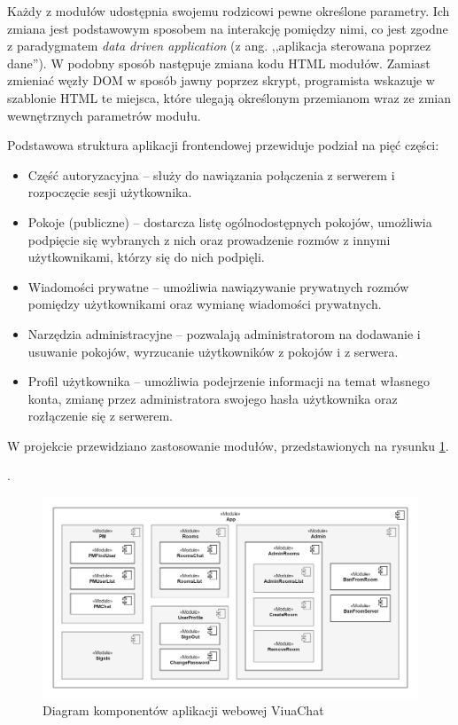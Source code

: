 Każdy z modułów udostępnia swojemu rodzicowi pewne określone parametry. Ich zmiana
jest podstawowym sposobem na interakcję pomiędzy nimi, co jest zgodne z
paradygmatem \textit{data driven application} (z ang. ,,aplikacja sterowana
poprzez dane''). W podobny sposób następuje zmiana kodu HTML modułów. Zamiast
zmieniać węzły DOM w sposób jawny poprzez skrypt, programista wskazuje w
szablonie HTML te miejsca, które ulegają określonym przemianom wraz ze
zmian wewnętrznych parametrów modułu.

Podstawowa struktura aplikacji frontendowej przewiduje podział na
pięć części:
\begin{itemize}
	\item Część autoryzacyjna -- służy do nawiązania połączenia z
	serwerem i rozpoczęcie sesji użytkownika.

	\item Pokoje (publiczne) -- dostarcza listę ogólnodostępnych pokojów,
	umożliwia podpięcie się wybranych z nich oraz prowadzenie rozmów z
	innymi użytkownikami, którzy się do nich podpięli.

	\item Wiadomości prywatne -- umożliwia nawiązywanie prywatnych
	rozmów pomiędzy użytkownikami oraz wymianę wiadomości prywatnych.

	\item Narzędzia administracyjne -- pozwalają administratorom
	na dodawanie i usuwanie pokojów, wyrzucanie użytkowników z pokojów
	i z serwera.

	\item Profil użytkownika -- umożliwia podejrzenie informacji na
	temat własnego konta, zmianę przez administratora swojego hasła
	użytkownika oraz rozłączenie się z serwerem.

\end{itemize}

W projekcie przewidziano zastosowanie modułów, przedstawionych na rysunku \ref{diag-komp-front}.

.
\begin{figure}[!htp]
	\centering
	\includegraphics[width=\textwidth]{chat/fig/pck-diag-front}
	\caption{Diagram komponentów aplikacji webowej ViuaChat}
	\label{diag-komp-front}
\end{figure}

